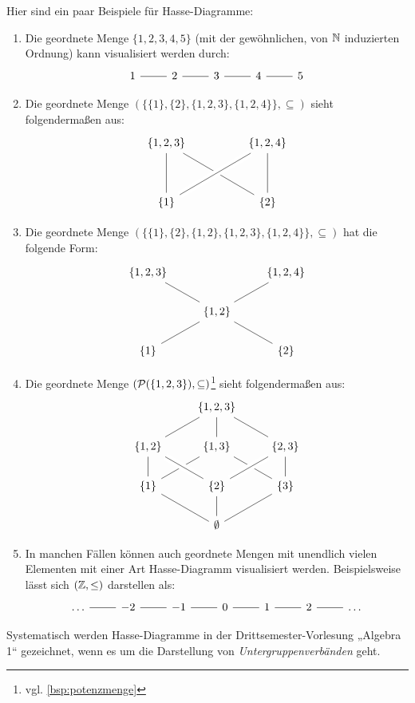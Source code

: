 \begin{bsp} \label{bsp:hasse}
    Hier sind ein paar Beispiele für Hasse-Diagramme:
    \begin{enumerate}
        \item Die geordnete Menge $\{1,2,3,4,5\}$ (mit der gewöhnlichen, von $\mathbb N$ induzierten Ordnung) kann visualisiert werden durch:
        \[\begin{tikzcd}
            1 \ar[r, dash] & 2 \ar[r, dash] & 3 \ar[r, dash] & 4 \ar[r, dash] & 5
        \end{tikzcd}\]
        \item Die geordnete Menge $(\{\{1\},\{2\},\{1,2,3\},\{1,2,4\}\},\subseteq)$ sieht folgendermaßen aus:
        \[\begin{tikzcd}
            \{1,2,3\} && \{1,2,4\} \\
            && \\
            \{1\} \ar[uu, dash] && \{2\} \ar[uu, dash] \ar[lluu, dash] \ar[from=ll, to=uu, dash, crossing over]
        \end{tikzcd}\]
        \item Die geordnete Menge $(\{\{1\},\{2\},\{1,2\},\{1,2,3\},\{1,2,4\}\},\subseteq)$ hat die folgende Form:
        \[\begin{tikzcd}
            \{1,2,3\} && \{1,2,4\} \\
            & \{1,2\} \ar[lu, dash] \ar[ru, dash] & \\
            \{1\} \ar[ru, dash] && \{2\} \ar[ul, dash]
        \end{tikzcd}\]
        \item Die geordnete Menge $(\mathcal P(\{1,2,3\}),\subseteq)$\footnote{vgl. \cref{bsp:potenzmenge}} sieht folgendermaßen aus:
        \[ \begin{tikzcd}
            & \{ 1,2,3 \} & \\
            \{ 1,2 \} \ar[ru, dash] & \{ 1,3\} \ar[u, dash] \ar[from = rd, dash] & \{ 2,3 \} \ar[lu, dash] \\
            \{ 1 \} \ar[u, dash] \ar[ru, dash] & \{ 2 \} \ar[lu, crossing over, dash] \ar[ru, crossing over, dash] & \{ 3 \} \ar[u, dash]\\
            & \emptyset \ar[lu, dash] \ar[ru, dash] \ar[u, dash] &
        \end{tikzcd} \]
        \item In manchen Fällen können auch geordnete Mengen mit unendlich vielen Elementen mit einer Art Hasse-Diagramm visualisiert werden. Beispielsweise lässt sich $(\mathbb Z,\le)$ darstellen als:
        \[\begin{tikzcd}
            \dots \ar[r, dash] & -2 \ar[r, dash] & -1 \ar[r, dash] & 0 \ar[r, dash] & 1 \ar[r, dash] & 2 \ar[r, dash] & \dots
        \end{tikzcd}\]
    \end{enumerate}
    Systematisch werden Hasse-Diagramme in der Drittsemester-Vorlesung „Algebra 1“ gezeichnet, wenn es um die Darstellung von \emph{Untergruppenverbänden} geht.
\end{bsp}



